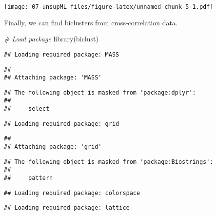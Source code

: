 \documentclass[
  oneside]{book}
\newenvironment{Shaded}{\begin{snugshade}}{\end{snugshade}}
\newcommand{\AttributeTok}[1]{\textcolor[rgb]{0.77,0.63,0.00}{#1}}
\newcommand{\CommentTok}[1]{\textcolor[rgb]{0.56,0.35,0.01}{\textit{#1}}}
\newcommand{\ConstantTok}[1]{\textcolor[rgb]{0.00,0.00,0.00}{#1}}
\newcommand{\DecValTok}[1]{\textcolor[rgb]{0.00,0.00,0.81}{#1}}
\newcommand{\FunctionTok}[1]{\textcolor[rgb]{0.00,0.00,0.00}{#1}}
\newcommand{\NormalTok}[1]{#1}
\newcommand{\OtherTok}[1]{\textcolor[rgb]{0.56,0.35,0.01}{#1}}
\newcommand{\SpecialCharTok}[1]{\textcolor[rgb]{0.00,0.00,0.00}{#1}}
\begin{document}
\texttt{[image: 07-unsupML\_files/figure-latex/unnamed-chunk-5-1.pdf]}

Finally, we can find biclusters from cross-correlation data.

\begin{Shaded}
\begin{Highlighting}[]
\CommentTok{\# Load package}
\FunctionTok{library}\NormalTok{(biclust)}
\end{Highlighting}
\end{Shaded}

\begin{verbatim}
## Loading required package: MASS
\end{verbatim}

\begin{verbatim}
## 
## Attaching package: 'MASS'
\end{verbatim}

\begin{verbatim}
## The following object is masked from 'package:dplyr':
## 
##     select
\end{verbatim}

\begin{verbatim}
## Loading required package: grid
\end{verbatim}

\begin{verbatim}
## 
## Attaching package: 'grid'
\end{verbatim}

\begin{verbatim}
## The following object is masked from 'package:Biostrings':
## 
##     pattern
\end{verbatim}

\begin{verbatim}
## Loading required package: colorspace
\end{verbatim}

\begin{verbatim}
## Loading required package: lattice
\end{verbatim}

\begin{Shaded}
\end{Shaded}
\end{document}
